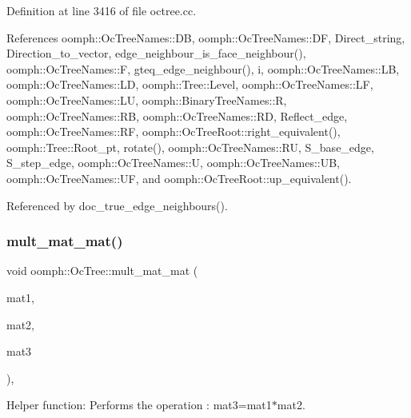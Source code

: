 Definition at line 3416 of file octree.\+cc.



References oomph\+::\+Oc\+Tree\+Names\+::\+DB, oomph\+::\+Oc\+Tree\+Names\+::\+DF, Direct\+\_\+string, Direction\+\_\+to\+\_\+vector, edge\+\_\+neighbour\+\_\+is\+\_\+face\+\_\+neighbour(), oomph\+::\+Oc\+Tree\+Names\+::F, gteq\+\_\+edge\+\_\+neighbour(), i, oomph\+::\+Oc\+Tree\+Names\+::\+LB, oomph\+::\+Oc\+Tree\+Names\+::\+LD, oomph\+::\+Tree\+::\+Level, oomph\+::\+Oc\+Tree\+Names\+::\+LF, oomph\+::\+Oc\+Tree\+Names\+::\+LU, oomph\+::\+Binary\+Tree\+Names\+::R, oomph\+::\+Oc\+Tree\+Names\+::\+RB, oomph\+::\+Oc\+Tree\+Names\+::\+RD, Reflect\+\_\+edge, oomph\+::\+Oc\+Tree\+Names\+::\+RF, oomph\+::\+Oc\+Tree\+Root\+::right\+\_\+equivalent(), oomph\+::\+Tree\+::\+Root\+\_\+pt, rotate(), oomph\+::\+Oc\+Tree\+Names\+::\+RU, S\+\_\+base\+\_\+edge, S\+\_\+step\+\_\+edge, oomph\+::\+Oc\+Tree\+Names\+::U, oomph\+::\+Oc\+Tree\+Names\+::\+UB, oomph\+::\+Oc\+Tree\+Names\+::\+UF, and oomph\+::\+Oc\+Tree\+Root\+::up\+\_\+equivalent().



Referenced by doc\+\_\+true\+\_\+edge\+\_\+neighbours().

\mbox{\label{classoomph_1_1OcTree_ad67128675db4b8d5d3e5815134d78fd2}} 
\subsubsection{\texorpdfstring{mult\+\_\+mat\+\_\+mat()}{mult\_mat\_mat()}}
{\footnotesize\ttfamily void oomph\+::\+Oc\+Tree\+::mult\+\_\+mat\+\_\+mat (\begin{DoxyParamCaption}\item[{const \hyperlink{classoomph_1_1DenseMatrix}{Dense\+Matrix}$<$ int $>$ \&}]{mat1,  }\item[{const \hyperlink{classoomph_1_1DenseMatrix}{Dense\+Matrix}$<$ int $>$ \&}]{mat2,  }\item[{\hyperlink{classoomph_1_1DenseMatrix}{Dense\+Matrix}$<$ int $>$ \&}]{mat3 }\end{DoxyParamCaption})\hspace{0.3cm}{\ttfamily [static]}, {\ttfamily [private]}}



Helper function\+: Performs the operation \+: mat3=mat1$\ast$mat2. 

